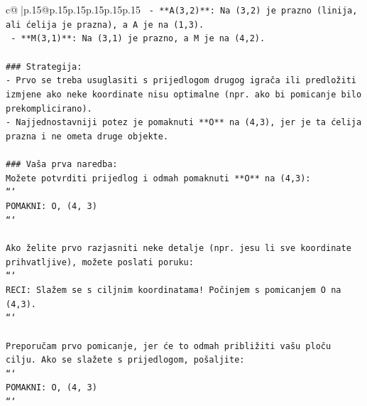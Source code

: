 \documentclass{article}
\begin{document}
{\begin{supertabular}{c@{$\;$}|p{.15\linewidth}@{}p{.15\linewidth}p{.15\linewidth}p{.15\linewidth}p{.15\linewidth}p{.15\linewidth}}
{{{\texttt{   {-} **A(3,2)**: Na (3,2) je prazno (linija, ali ćelija je prazna), a A je na (1,3).} \\
\texttt{   {-} **M(3,1)**: Na (3,1) je prazno, a M je na (4,2).} \\
\\ 
\texttt{\#\#\# Strategija:} \\
\texttt{{-} Prvo se treba usuglasiti s prijedlogom drugog igrača ili predložiti izmjene ako neke koordinate nisu optimalne (npr. ako bi pomicanje bilo prekomplicirano).} \\
\texttt{{-} Najjednostavniji potez je pomaknuti **O** na (4,3), jer je ta ćelija prazna i ne ometa druge objekte.} \\
\\ 
\texttt{\#\#\# Vaša prva naredba:} \\
\texttt{Možete potvrditi prijedlog i odmah pomaknuti **O** na (4,3):} \\
\texttt{```} \\
\texttt{POMAKNI: O, (4, 3)} \\
\texttt{```} \\
\\ 
\texttt{Ako želite prvo razjasniti neke detalje (npr. jesu li sve koordinate prihvatljive), možete poslati poruku:} \\
\texttt{```} \\
\texttt{RECI: Slažem se s ciljnim koordinatama! Počinjem s pomicanjem O na (4,3).} \\
\texttt{```} \\
\\ 
\texttt{Preporučam prvo pomicanje, jer će to odmah približiti vašu ploču cilju. Ako se slažete s prijedlogom, pošaljite:} \\
\texttt{```} \\
\texttt{POMAKNI: O, (4, 3)} \\
\texttt{```} \\
            }
        }
    }
     \\ \\


\end{supertabular}}
\end{document}
